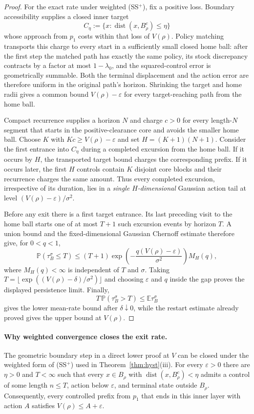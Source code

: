 \documentclass[11pt]{article}
\theoremstyle{definition}
\theoremstyle{remark}
\numberwithin{equation}{section}
\begin{document}
\begin{proof}
For the exact rate under weighted (SS$^+$), fix a positive loss. Boundary accessibility supplies a closed inner target
\[
C_\eta:=\{x:\operatorname{dist}(x,B_\rho^c)\le\eta\}
\]
whose approach from $p_1$ costs within that loss of $V(\rho)$. Policy matching transports this charge to every start in a sufficiently small closed home ball: after the first step the matched path has exactly the same policy, its stock discrepancy contracts by a factor at most $1-\lambda_0$, and the squared-control error is geometrically summable. Both the terminal displacement and the action error are therefore uniform in the original path's horizon. Shrinking the target and home radii gives a common bound $V(\rho)-\varepsilon$ for every target-reaching path from the home ball.

Compact recurrence supplies a horizon $N$ and charge $c>0$ for every length-$N$ segment that starts in the positive-clearance core and avoids the smaller home ball. Choose $K$ with $Kc\ge V(\rho)-\varepsilon$ and set $H=(K+1)(N+1)$. Consider the first entrance into $C_\eta$ during a completed excursion from the home ball. If it occurs by $H$, the transported target bound charges the corresponding prefix. If it occurs later, the first $H$ controls contain $K$ disjoint core blocks and their recurrence charges the same amount. Thus every completed excursion, irrespective of its duration, lies in a \emph{single $H$-dimensional} Gaussian action tail at level $(V(\rho)-\varepsilon)/\sigma^2$.

Before any exit there is a first target entrance. Its last preceding visit to the home ball starts one of at most $T+1$ such excursion events by horizon $T$. A union bound and the fixed-dimensional Gaussian Chernoff estimate therefore give, for $0<q<1$,
\[
\mathbb P(\tau_B^\sigma\le T)
\le (T+1)\exp\!\left(-\frac{q(V(\rho)-\varepsilon)}{\sigma^2}\right)M_H(q),
\]
where $M_H(q)<\infty$ is independent of $T$ and $\sigma$. Taking $T=\lfloor\exp((V(\rho)-\delta)/\sigma^2)\rfloor$ and choosing $\varepsilon$ and $q$ inside the gap proves the displayed persistence limit. Finally,
\[
T\,\mathbb P(\tau_B^\sigma>T)\le \mathbb E\tau_B^\sigma
\]
gives the lower mean-rate bound after $\delta\downarrow0$, while the restart estimate already proved gives the upper bound at $V(\rho)$.
\end{proof}

\paragraph{Why weighted convergence closes the exit rate.}
The geometric boundary step in a direct lower proof at $V$ can be closed under the weighted form of (SS$^+$) used in Theorem~\ref{thm:hyst}(iii). For every $\varepsilon>0$ there are $\eta>0$ and $T<\infty$ such that every $x\in B_\rho$ with $\operatorname{dist}(x,B_\rho^c)<\eta$ admits a control of some length $n\le T$, action below $\varepsilon$, and terminal state outside $B_\rho$. Consequently, every controlled prefix from $p_1$ that ends in this inner layer with action $A$ satisfies $V(\rho)\le A+\varepsilon$.
\end{document}
